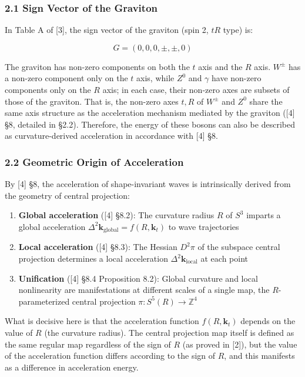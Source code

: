 \documentclass[
  a4paper,11pt]{article}
\theoremstyle{definition}
\theoremstyle{remark}
\begin{document}
\subsubsection{2.1 Sign Vector of the
Graviton}\label{sign-vector-of-the-graviton}

In Table A of {[}3{]}, the sign vector of the graviton (spin 2, \(tR\)
type) is:

\[G = (0, 0, 0, \pm, \pm, 0)\]

The graviton has non-zero components on both the \(t\) axis and the
\(R\) axis. \(W^{\pm}\) has a non-zero component only on the \(t\) axis,
while \(Z^0\) and \(\gamma\) have non-zero components only on the \(R\)
axis; in each case, their non-zero axes are subsets of those of the
graviton. That is, the non-zero axes \(t, R\) of \(W^{\pm}\) and \(Z^0\)
share the same axis structure as the acceleration mechanism mediated by
the graviton ({[}4{]} §8, detailed in §2.2). Therefore, the energy of
these bosons can also be described as curvature-derived acceleration in
accordance with {[}4{]} §8.

\subsubsection{2.2 Geometric Origin of
Acceleration}\label{geometric-origin-of-acceleration}

By {[}4{]} §8, the acceleration of shape-invariant waves is
intrinsically derived from the geometry of central projection:

\begin{enumerate}
\def\labelenumi{(\roman{enumi})}
\item
  \textbf{Global acceleration} ({[}4{]} §8.2): The curvature radius
  \(R\) of \(S^3\) imparts a global acceleration
  \(\Delta^2\mathbf{k}_{\text{global}} = f(R, \mathbf{k}_t)\) to wave
  trajectories
\item
  \textbf{Local acceleration} ({[}4{]} §8.3): The Hessian \(D^2\pi\) of
  the subspace central projection determines a local acceleration
  \(\Delta^2\mathbf{k}_{\text{local}}\) at each point
\item
  \textbf{Unification} ({[}4{]} §8.4 Proposition 8.2): Global curvature
  and local nonlinearity are manifestations at different scales of a
  single map, the \(R\)-parameterized central projection
  \(\pi: S^5(R) \to \mathbb{Z}^4\)
\end{enumerate}

What is decisive here is that the acceleration function
\(f(R, \mathbf{k}_t)\) depends on the value of \(R\) (the curvature
radius). The central projection map itself is defined as the same
regular map regardless of the sign of \(R\) (as proved in {[}2{]}), but
the value of the acceleration function differs according to the sign of
\(R\), and this manifests as a difference in acceleration energy.
\end{document}

